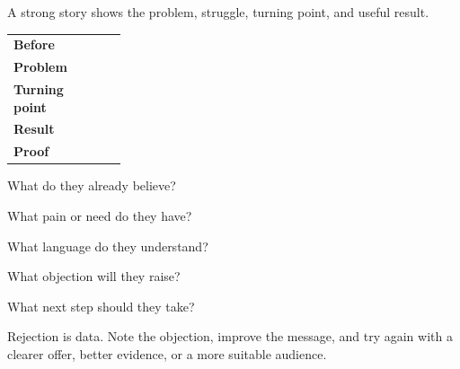 \documentclass[10pt,a4paper]{article}
\newcommand{\CheckLine}{\raisebox{0.2ex}{\Large$\square$}\hspace{1mm}}
\begin{document}
\begin{minipage}[t]{0.49\linewidth}
\begin{tcolorbox}[usebox,title={4. Tell a compelling story}]
A strong story shows the problem, struggle, turning point, and useful result.\par\vspace{2mm}
\begin{tabularx}{\linewidth}{>{\bfseries}p{0.25\linewidth}X}
Before & \\
Problem & \\
Turning point & \\
Result & \\
Proof & \\
\end{tabularx}
\end{tcolorbox}

\begin{tcolorbox}[usebox,title={5. Know the audience}]
\CheckLine What do they already believe?\par
\CheckLine What pain or need do they have?\par
\CheckLine What language do they understand?\par
\CheckLine What objection will they raise?\par
\CheckLine What next step should they take?
\end{tcolorbox}

\begin{tcolorbox}[usebox,title={6. Improve after rejection}]
Rejection is data. Note the objection, improve the message, and try again with a clearer offer, better evidence, or a more suitable audience.
\end{tcolorbox}
\end{minipage}
\end{document}

